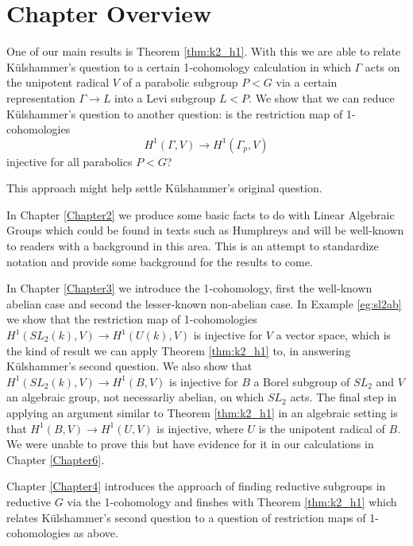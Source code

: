 \section{Chapter Overview}

One of our main results is Theorem \ref{thm:k2_h1}. With this we are able to relate K\"ulshammer's question to a certain 1-cohomology calculation in which $\Gamma$ acts on the unipotent radical $V$ of a parabolic subgroup $P < G$ via a certain representation $\Gamma \rightarrow L$ into a Levi subgroup $L < P$. We show that we can reduce K\"ulshammer's question to another question: is the restriction map of 1-cohomologies
\begin{displaymath}
  H^1(\Gamma, V) \rightarrow H^1(\Gamma_p, V)
\end{displaymath}
injective for all parabolics $P<G$?

This approach might help settle K\"ulshammer's original question.

In Chapter \ref{Chapter2} we produce some basic facts to do with Linear Algebraic Groups which could be found in texts such as Humphreys \cite{humphryes1975linear} and will be well-known to readers with a background in this area. This is an attempt to standardize notation and provide some background for the results to come.

In Chapter \ref{Chapter3} we introduce the 1-cohomology, first the well-known abelian case and second the lesser-known non-abelian case. In Example \ref{eg:sl2ab} we show that the restriction map of 1-cohomologies $H^1(SL_2(k), V) \rightarrow H^1(U(k), V)$ is injective for $V$ a vector space, which is the kind of result we can apply Theorem \ref{thm:k2_h1} to, in answering K\"ulshammer's second question. We also show that $H^1(SL_2(k), V) \rightarrow H^1(B, V)$ is injective for $B$ a Borel subgroup of $SL_2$ and $V$ an algebraic group, not necessarliy abelian, on which $SL_2$ acts. The final step in applying an argument similar to Theorem \ref{thm:k2_h1} in an algebraic setting is that $H^1(B, V) \rightarrow H^1(U, V)$ is injective, where $U$ is the unipotent radical of $B$. We were unable to prove this but have evidence for it in our calculations in Chapter \ref{Chapter6}.

Chapter \ref{Chapter4} introduces the approach of finding reductive subgroups in reductive $G$ via the 1-cohomology and finshes with Theorem \ref{thm:k2_h1} which relates K\"ulshammer's second question to a question of restriction maps of 1-cohomologies as above.

